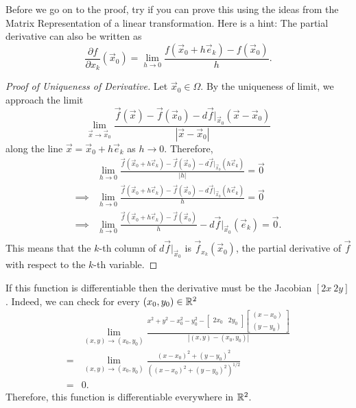 Before we go on to the proof, try if you can prove this using the ideas from the Matrix Representation of a linear transformation.
Here is a hint: The partial derivative can also be written as \[
\frac{\partial{f}}{\partial {x}_k}(\vec{x}_0) = \lim_{h\to 0}\frac{f(\vec{x}_0+h\vec{e}_k)-f(\vec{x}_0)}{h}.
\]
\begin{proof}[Proof of Uniqueness of Derivative]
    Let $\vec{x}_0\in \Omega$. By the uniqueness of limit, we approach the limit \[
        \lim_{\vec{x}\to\vec{x}_0} \frac{\vec{f}(\vec{x})-\vec{f}(\vec{x}_0)-d\vec{f}|_{\vec{x}_0}(\vec{x}-\vec{x}_0)}{|\vec{x}-\vec{x}_0|}
    \]
    along the line $\vec{x}=\vec{x}_0+h\vec{e}_k$ as $h\to 0$. Therefore, 
    \begin{align*}
        &\lim_{h\to 0} \frac{\vec{f}(\vec{x}_0+h\vec{e}_k)-\vec{f}(\vec{x}_0)-d\vec{f}|_{\vec{x}_0}(h\vec{e}_k)}{|h|}=\vec{0} \\
        \implies &\lim_{h\to 0} \frac{\vec{f}(\vec{x}_0+h\vec{e}_k)-\vec{f}(\vec{x}_0)-d\vec{f}|_{\vec{x}_0}(h\vec{e}_k)}{h}=\vec{0}\\
        \implies &\lim_{h\to 0} \frac{\vec{f}(\vec{x}_0+h\vec{e}_k)-\vec{f}(\vec{x}_0)}{h}-d\vec{f}|_{\vec{x}_0}(\vec{e}_k)=\vec{0}.\\
    \end{align*}
    This means that the $k$-th column of $d\vec{f}|_{\vec{x}_0}$ is $\vec{f}_{x_k}(\vec{x}_0)$, the partial derivative of $\vec{f}$ with respect to the $k$-th variable.
\end{proof}


If this function is differentiable then the derivative must be the Jacobian $[2x \ 2y]$. Indeed, we can check for every $(x_0,y_0)\in\mathbb{R}^2$ \begin{align*}
    &\lim_{(x,y)\to(x_0,y_0)}\frac{x^2+y^2-x_0^2-y_0^2 - \begin{bmatrix}
        2x_0 & 2y_0 
    \end{bmatrix}\begin{bmatrix}
        (x-x_0)\\(y-y_0)
    \end{bmatrix}}{|(x,y)-(x_0,y_0)|}\\
    =&\lim_{(x,y)\to(x_0,y_0)}\frac{
        (x-x_0)^2+(y-y_0)^2}{((x-x_0)^2+(y-y_0)^2)^{1/2}}\\
    =&0.
\end{align*}
Therefore, this function is differentiable everywhere in $\mathbb{R}^2$.

